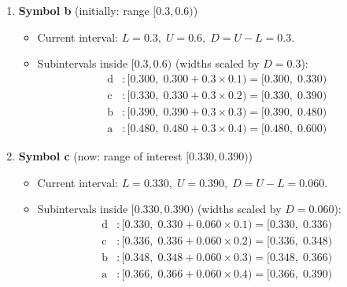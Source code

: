 \documentclass[11pt,a4paper]{book}
\newcounter{qna}[chapter]
\renewcommand{\theqna}{\thechapter.\arabic{qna}}
\newenvironment{questionanswerbox}{
    \refstepcounter{qna}%
    \begin{tcolorbox}[
        enhanced,
        breakable,
        colback=softlavender!10,
        colframe=softlavender!200,
        title={Example~\theqna}, %
        fonttitle=\bfseries,
        coltitle=white,
        colbacktitle=softlavender!200,
        sharp corners,
        boxrule=1pt,
        left=8pt,
        right=8pt,
        top=6pt,
        bottom=6pt
    ]
}{
    \end{tcolorbox}
}
\begin{document}
\begin{questionanswerbox}
\begin{itemize}
              \begin{enumerate}
                  \item \textbf{Symbol b} (initially: range $[0.3,0.6)$)
                        \begin{itemize}
                            \item Current interval: $L=0.3,\; U=0.6,\; D=U-L=0.3$.
                            \item Subintervals inside $[0.3,0.6)$ (widths scaled by $D=0.3$):
                                  \[
                                      \begin{aligned}
                                          \text{d} & : {[0.300,\;0.300 + 0.3\times0.1)} = {[0.300,\;0.330)} \\
                                          \text{c} & : {[0.330,\;0.330 + 0.3\times0.2)} = {[0.330,\;0.390)} \\
                                          \text{b} & : {[0.390,\;0.390 + 0.3\times0.3)} = {[0.390,\;0.480)} \\
                                          \text{a} & : {[0.480,\;0.480 + 0.3\times0.4)} = {[0.480,\;0.600)}
                                      \end{aligned}
                                  \]
                        \end{itemize}

                  \item \textbf{Symbol c} (now: range of interest $[0.330,0.390)$)
                        \begin{itemize}
                            \item Current interval: $L=0.330,\; U=0.390,\; D=U-L=0.060$.
                            \item Subintervals inside $[0.330,0.390)$ (widths scaled by $D=0.060$):
                                  \[
                                      \begin{aligned}
                                          \text{d} & : {[0.330,\;0.330 + 0.060\times0.1)} = {[0.330,\;0.336)} \\
                                          \text{c} & : {[0.336,\;0.336 + 0.060\times0.2)} = {[0.336,\;0.348)} \\
                                          \text{b} & : {[0.348,\;0.348 + 0.060\times0.3)} = {[0.348,\;0.366)} \\
                                          \text{a} & : {[0.366,\;0.366 + 0.060\times0.4)} = {[0.366,\;0.390)}
                                      \end{aligned}
                                  \]
                        \end{itemize}


\end{enumerate}
\end{itemize}
\end{questionanswerbox}
\end{document}

